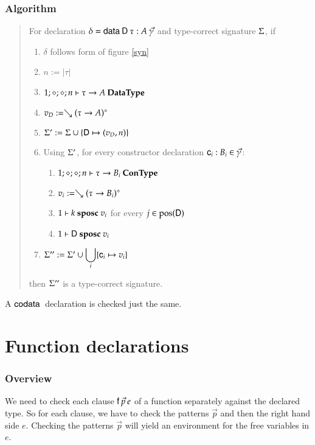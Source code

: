 \subsubsection{Algorithm}
\begin{quote}
For declaration $\delta = \mathsf{data}\: \mathsf{D} \: \tau : A \: \vec{\gamma}$ and type-correct signature $\Sigma$, if 
\begin{enumerate}
\item 
$\delta$ follows form of figure \ref{syn}
\item
$ n := \vert\tau\vert $
\item
$1;\diamond;\diamond;n\vdash \tau \rightarrow A\:\mathbf{DataType}$ 
\item
$v_D := \searrow (\tau \rightarrow A)^{\diamond}$
\item
$\Sigma' := \Sigma \cup \{\mathsf{D} \mapsto (v_D,n)\}$
\item
Using $\Sigma'$, for every constructor declaration $\mathsf{c}_i : B_i  \in \vec{\gamma}$:
\begin{enumerate} 
\item
$1;\diamond;\diamond;n\vdash\tau \rightarrow B_i\:\mathbf{ConType}$ 
\item
$v_i := \searrow (\tau \rightarrow B_i)^{\diamond}$
\item
$1\vdash k\mbox{ \textbf{sposc} }v_i$ for every $j \in \mbox{pos}(\mathsf{D}) $ 
\item
$1\vdash\mathsf{D}\mbox{ \textbf{sposc} }v_i$ 
\end{enumerate}
\item
$\Sigma'' := \Sigma' \cup \displaystyle\bigcup_{i} \{\mathsf{c}_i \mapsto v_i\}$
\end{enumerate}
then $\Sigma''$ is a type-correct signature.
\end{quote}
A $\mathsf{codata}\:$ declaration is checked just the same.


\section{Function declarations}

\newcommand\checkcl[2]{#1\:\mathbf{checkcl}\:#2}
\newcommand\checkp[5]{(#1)\vdash#2\:\mathbf{chkP}\:#3\Rightarrow (#4),#5}
\newcommand\checkps[5]{(#1)\vdash#2\:\mathbf{chkPs}\:#3\Rightarrow (#4),#5}
\newcommand\checkinacc[4]{(#1)\vdash#2\:\mathbf{checkinacc}\:#3 : #4}
\newcommand\unify[5]{#1,#2\vdash#3\:\mathbf{inst}\:#4\Rightarrow #5}
\newcommand\unifylist[5]{#1,#2\vdash#3\:\mathbf{inst_{list}}\:#4\Rightarrow #5}


\subsubsection{Overview}
We need to check each clause $\mathsf{f} \: \vec{p} \: e$ of a function separately against the declared type.
So for each clause, we have to check the patterns $\vec{p}$ and then the right hand side $e$.
Checking the patterns $\vec{p}$ will yield an environment for the free variables in $e$.

